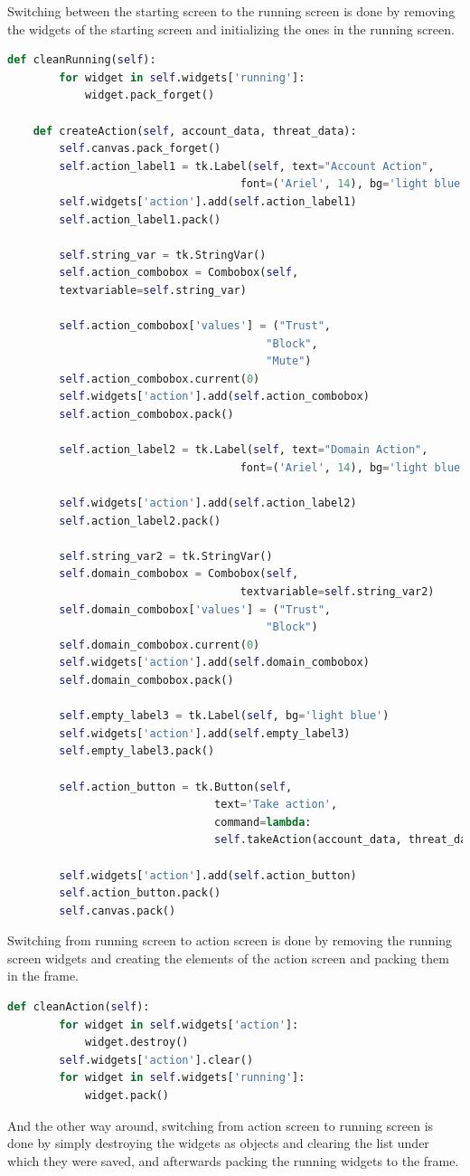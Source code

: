 Switching between the starting screen to the running screen is done by removing the widgets of the starting screen and initializing
the ones in the running screen.
\\[5pt]
\begin{lstlisting}[language=python, caption={Switching from running screen to action screen}, captionpos=b]
	 def cleanRunning(self):
		for widget in self.widgets['running']:
			widget.pack_forget()
	
	def createAction(self, account_data, threat_data):
		self.canvas.pack_forget()
		self.action_label1 = tk.Label(self, text="Account Action", 
									font=('Ariel', 14), bg='light blue')
		self.widgets['action'].add(self.action_label1)
		self.action_label1.pack()
		
		self.string_var = tk.StringVar()
		self.action_combobox = Combobox(self, 
		textvariable=self.string_var)
		
		self.action_combobox['values'] = ("Trust", 
										"Block",
										"Mute")
		self.action_combobox.current(0)
		self.widgets['action'].add(self.action_combobox)
		self.action_combobox.pack()
		
		self.action_label2 = tk.Label(self, text="Domain Action", 
									font=('Ariel', 14), bg='light blue')
		
		self.widgets['action'].add(self.action_label2)
		self.action_label2.pack()
		
		self.string_var2 = tk.StringVar()
		self.domain_combobox = Combobox(self, 
									textvariable=self.string_var2)
		self.domain_combobox['values'] = ("Trust", 
										"Block")
		self.domain_combobox.current(0)
		self.widgets['action'].add(self.domain_combobox)
		self.domain_combobox.pack()
		
		self.empty_label3 = tk.Label(self, bg='light blue')
		self.widgets['action'].add(self.empty_label3)
		self.empty_label3.pack()
		
		self.action_button = tk.Button(self, 
								text='Take action', 
								command=lambda:
								self.takeAction(account_data, threat_data))
		
		self.widgets['action'].add(self.action_button)
		self.action_button.pack()
		self.canvas.pack()
\end{lstlisting}
Switching from running screen to action screen is done by removing the running screen widgets and creating the elements 
of the action screen and packing them in the frame.
\\[5pt]
\begin{lstlisting}[language=python, caption={Switching from action screen to running screen}, captionpos=b]
	def cleanAction(self):
		for widget in self.widgets['action']:
			widget.destroy()
		self.widgets['action'].clear()
		for widget in self.widgets['running']:
			widget.pack()
\end{lstlisting}
And the other way around, switching from action screen to running screen is done by simply destroying the widgets as objects and clearing the list
under which they were saved, and afterwards packing the running widgets to the frame.
